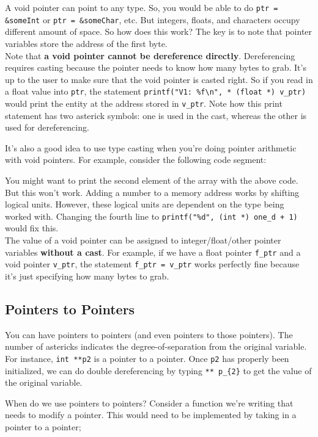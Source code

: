 A void pointer can point to any type. So, you would be able to do \verb!ptr = &someInt! or \verb!ptr = &someChar!, etc. But integers, floats, and characters occupy different amount of space. So how does this work? The key is to note that pointer variables store the address of the first byte. \\


Note that \textbf{a void pointer cannot be dereference directly}. Dereferencing requires casting because the pointer needs to know how many bytes to grab. It's up to the user to make sure that the void pointer is casted right. So if you read in a float value into \verb!ptr!, the statement \verb!printf("V1: %f\n", * (float *) v_ptr)! would print the entity at the address stored in \verb!v_ptr!. Note how this print statement has two asterick symbols: one is used in the cast, whereas the other is used for dereferencing. 


It's also a good idea to use type casting when you're doing pointer arithmetic with void pointers. For example, consider the following code segment:

\lstset{
caption=Bad Void Pointer Arithmetic
}
\begin{center}
\label{Bad Pointer Arithmetic}
\end{center}

You might want to print the second element of the array with the above code. But this won't work. Adding a number to a memory address works by shifting logical units. However, these logical units are dependent on the type being worked with. Changing the fourth line to \verb!printf("%d", (int *) one_d + 1)! would fix this. \\


The value of a void pointer can be assigned to integer/float/other pointer variables \textbf{without a cast}. For example, if we have a float pointer \verb!f_ptr! and a void pointer \verb!v_ptr!, the statement \verb!f_ptr = v_ptr! works perfectly fine because it's just specifying how many bytes to grab. 


\subsection{Pointers to Pointers}
You can have pointers to pointers (and even pointers to those pointers). The number of astericks indicates the degree-of-separation from the original variable. For instance, \texttt{int **p2} is a pointer to a pointer. Once \verb!p2! has properly been initialized, we can do double dereferencing by typing \verb!** p_{2}! to get the value of the original variable. 

When do we use pointers to pointers? Consider a function we're writing that needs to modify a pointer. This would need to be implemented by taking in a pointer to a pointer;  
